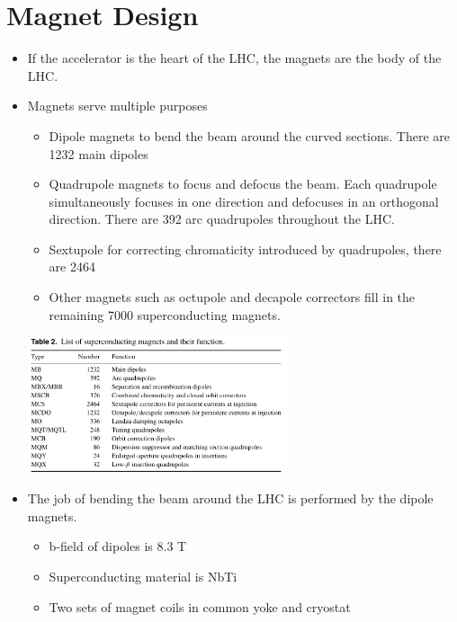 \section{Magnet Design}
\begin{itemize}
    \item If the accelerator is the heart of the LHC, the magnets are the body of the LHC.
    \item Magnets serve multiple purposes \cite{lyndon}
    \begin{itemize}\scriptsize
        \item Dipole magnets to bend the beam around the curved sections. There are 1232 main dipoles
        \item Quadrupole magnets to focus and defocus the beam. Each quadrupole simultaneously focuses in one direction and defocuses in an orthogonal direction. There are 392 arc quadrupoles throughout the LHC.
        \item Sextupole for correcting chromaticity introduced by quadrupoles, there are 2464
        \item Other magnets such as octupole and decapole correctors fill in the remaining 7000 superconducting magnets.
    \end{itemize}
    \begin{center}
        \includegraphics[width=0.6\textwidth]{figures/notes-experiment/listmagnets.png}
    \end{center}
    \item The job of bending the beam around the LHC is performed by the dipole magnets.
    \begin{itemize}\scriptsize
        \item b-field of dipoles is 8.3 T \cite{lyndon}
        \item Superconducting material is NbTi \cite{lyndon}
        \item Two sets of magnet coils in common yoke and cryostat \cite{lyndon}

\end{itemize}
\end{itemize}
